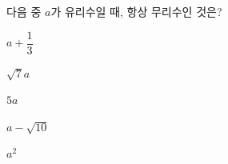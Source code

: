 다음 중 $a$가 유리수일 때, 항상 무리수인 것은?
\begin{choices32}{\rule[-3ex]{0pt}{8ex}$a+\dfrac{1}{3}$}{\rule[-3ex]{0pt}{8ex}$\sqrt{7}a$}{\rule[-3ex]{0pt}{8ex}$5a$}{\rule[-3ex]{0pt}{8ex}$a-\sqrt{10}$}{\rule[-3ex]{0pt}{8ex}$a^2$}\end{choices32}
